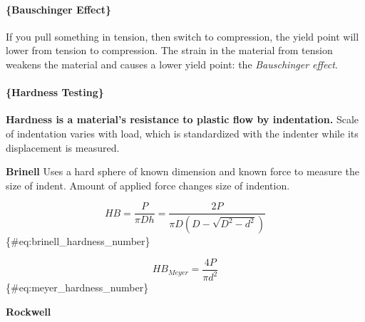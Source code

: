 \documentclass[
]{article}
\begin{document}
\hypertarget{bauschinger-effect}{%
\paragraph{\{Bauschinger Effect\}}\label{bauschinger-effect}}

If you pull something in tension, then switch to compression, the yield
point will lower from tension to compression. The strain in the material
from tension weakens the material and causes a lower yield point: the
\textit{Bauschinger effect}.

\hypertarget{hardness-testing}{%
\paragraph{\{Hardness Testing\}}\label{hardness-testing}}

\textbf{Hardness is a material's resistance to plastic flow by indentation.}
Scale of indentation varies with load, which is standardized with the
indenter while its displacement is measured.

\textbf{Brinell} Uses a hard sphere of known dimension and known force
to measure the size of indent. Amount of applied force changes size of
indention.

\[ HB = \frac{P}{\pi Dh} = \frac{2P}{\pi D(D - \sqrt{D^{2} - d^{2}})}\]
\{\#eq:brinell\_hardness\_number\}

\[ HB_{Meyer} = \frac{4P}{\pi d^{2}} \] \{\#eq:meyer\_hardness\_number\}

\textbf{Rockwell}
\end{document}
